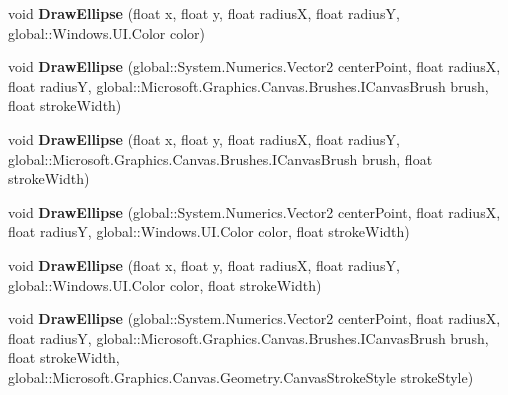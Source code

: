 \begin{DoxyCompactItemize}
void {\bfseries Draw\+Ellipse} (float x, float y, float radiusX, float radiusY, global\+::\+Windows.\+U\+I.\+Color color)
\item 
\mbox{\label{class_microsoft_1_1_graphics_1_1_canvas_1_1_canvas_drawing_session_aaf3284a99b7cf00f111c35c5e11a889b}} 
void {\bfseries Draw\+Ellipse} (global\+::\+System.\+Numerics.\+Vector2 center\+Point, float radiusX, float radiusY, global\+::\+Microsoft.\+Graphics.\+Canvas.\+Brushes.\+I\+Canvas\+Brush brush, float stroke\+Width)
\item 
\mbox{\label{class_microsoft_1_1_graphics_1_1_canvas_1_1_canvas_drawing_session_aa13437c0721acd2270fcea212b03b8f7}} 
void {\bfseries Draw\+Ellipse} (float x, float y, float radiusX, float radiusY, global\+::\+Microsoft.\+Graphics.\+Canvas.\+Brushes.\+I\+Canvas\+Brush brush, float stroke\+Width)
\item 
\mbox{\label{class_microsoft_1_1_graphics_1_1_canvas_1_1_canvas_drawing_session_a5a91d792553d1fc1f81c18d11b313cf3}} 
void {\bfseries Draw\+Ellipse} (global\+::\+System.\+Numerics.\+Vector2 center\+Point, float radiusX, float radiusY, global\+::\+Windows.\+U\+I.\+Color color, float stroke\+Width)
\item 
\mbox{\label{class_microsoft_1_1_graphics_1_1_canvas_1_1_canvas_drawing_session_a9b0446388e80dc69a1a899682e3e1be9}} 
void {\bfseries Draw\+Ellipse} (float x, float y, float radiusX, float radiusY, global\+::\+Windows.\+U\+I.\+Color color, float stroke\+Width)
\item 
\mbox{\label{class_microsoft_1_1_graphics_1_1_canvas_1_1_canvas_drawing_session_aec377136857c05db63fdc819a9b607c9}} 
void {\bfseries Draw\+Ellipse} (global\+::\+System.\+Numerics.\+Vector2 center\+Point, float radiusX, float radiusY, global\+::\+Microsoft.\+Graphics.\+Canvas.\+Brushes.\+I\+Canvas\+Brush brush, float stroke\+Width, global\+::\+Microsoft.\+Graphics.\+Canvas.\+Geometry.\+Canvas\+Stroke\+Style stroke\+Style)
\item 
\mbox{\label{class_microsoft_1_1_graphics_1_1_canvas_1_1_canvas_drawing_session_ab9d765ab0eb1de32b301c64e51f8e27e}} 

\end{DoxyCompactItemize}
